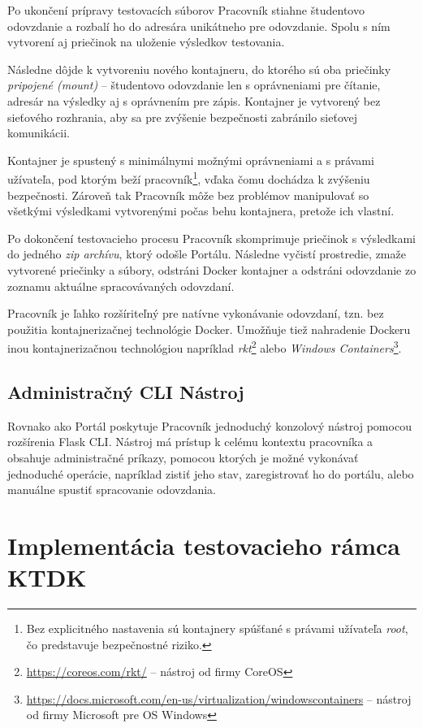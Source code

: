 \documentclass[
  digital, %
  twoside, %
  table,   %
  lof,     %
  lot,     %
]{fithesis3}
\begin{document}
Po ukončení prípravy testovacích súborov Pracovník stiahne študentovo odovzdanie a rozbalí ho do adresára unikátneho pre odovzdanie. Spolu s ním vytvorení aj priečinok na uloženie výsledkov testovania. 

Následne dôjde k vytvoreniu nového kontajneru, do ktorého sú oba priečinky \emph{pripojené (\emph{mount})} -- študentovo odovzdanie len s oprávneniami pre čítanie, adresár na výsledky aj s oprávnením pre zápis. Kontajner je vytvorený bez sieťového rozhrania, aby sa pre zvýšenie bezpečnosti zabránilo sieťovej komunikácii.

Kontajner je spustený s minimálnymi možnými oprávneniami a s právami užívateľa, pod ktorým beží pracovník\footnote{Bez explicitného nastavenia sú kontajnery spúšťané s právami užívateľa \emph{root}, čo predstavuje bezpečnostné riziko.}, vďaka čomu dochádza k zvýšeniu bezpečnosti. Zároveň tak Pracovník môže bez problémov manipulovať so všetkými výsledkami vytvorenými počas behu kontajnera, pretože ich vlastní.

Po dokončení testovacieho procesu Pracovník skomprimuje priečinok s výsledkami do jedného \emph{zip archívu}, ktorý odošle Portálu. Následne vyčistí prostredie, zmaže vytvorené priečinky a súbory, odstráni Docker kontajner a odstráni odovzdanie zo zoznamu aktuálne spracovávaných odovzdaní.

Pracovník je ľahko rozšíriteľný pre natívne vykonávanie odovzdaní, tzn. bez použitia kontajnerizačnej technológie Docker. Umožňuje tiež nahradenie Dockeru inou kontajnerizačnou technológiou napríklad \emph{rkt}\footnote{\url{https://coreos.com/rkt/} -- nástroj od firmy CoreOS} alebo \emph{Windows Containers}\footnote{\url{https://docs.microsoft.com/en-us/virtualization/windowscontainers} -- nástroj od firmy Microsoft pre OS Windows}.

\subsection{Administračný CLI Nástroj}

Rovnako ako Portál poskytuje Pracovník jednoduchý konzolový nástroj pomocou rozšírenia Flask CLI. Nástroj má prístup k celému kontextu pracovníka a obsahuje administračné príkazy, pomocou ktorých je možné vykonávať jednoduché operácie, napríklad zistiť jeho stav, zaregistrovať ho do portálu, alebo manuálne spustiť spracovanie odovzdania.


\section{Implementácia testovacieho rámca KTDK}
\end{document}
